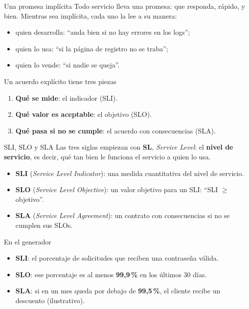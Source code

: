 \documentclass[institutional,screen,none]{ua-engineering-v6-beamer}
\begin{document}

\begin{frame}{Una promesa implícita}
Todo servicio lleva una promesa: que responda, rápido, y bien. Mientras sea implícita, cada uno la lee a su manera:
\begin{itemize}\small
\item quien desarrolla: ``anda bien si no hay errores en los logs'';
\item quien lo usa: ``si la página de registro no se traba'';
\item quien lo vende: ``si nadie se queja''.
\end{itemize}

\pause

\begin{block}{Un acuerdo explícito tiene tres piezas}
\begin{enumerate}
\item \textbf{Qué se mide}: el indicador (SLI).
\item \textbf{Qué valor es aceptable}: el objetivo (SLO).
\item \textbf{Qué pasa si no se cumple}: el acuerdo con consecuencias (SLA).
\end{enumerate}
\end{block}
\end{frame}

\begin{frame}{SLI, SLO y SLA}
Las tres siglas empiezan con \textbf{SL}, \emph{Service Level}: el \textbf{nivel de servicio}, es decir, qué tan bien le funciona el servicio a quien lo usa.

\begin{itemize}
\item \textbf{SLI} (\emph{Service Level Indicator}): una medida cuantitativa del nivel de servicio.
\item \textbf{SLO} (\emph{Service Level Objective}): un valor objetivo para un SLI: ``SLI $\ge$ objetivo''.
\item \textbf{SLA} (\emph{Service Level Agreement}): un contrato con consecuencias si no se cumplen sus SLOs.
\end{itemize}

\pause

\begin{block}{En el generador}
\begin{itemize}\small
\item \textbf{SLI}: el porcentaje de solicitudes que reciben una contraseña válida.
\item \textbf{SLO}: ese porcentaje es al menos \textbf{99,9\,\%} en los últimos 30 días.
\item \textbf{SLA}: si en un mes queda por debajo de \textbf{99,5\,\%}, el cliente recibe un descuento (ilustrativo).
\end{itemize}
\end{block}
\end{frame}
\end{document}
